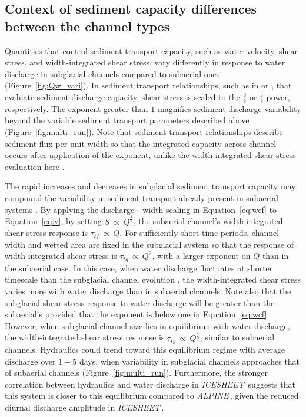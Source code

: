 \documentclass[11pt]{article}
\newcommand{\alpine}{\textit{ALPINE}\,}
\newcommand{\icesheet}{\textit{ICESHEET}\,}
\begin{document}
\subsection{Context of sediment capacity differences between the channel types}
Quantities that control sediment transport capacity, such as water velocity, shear stress, and width-integrated shear stress, vary differently in response to water discharge in subglacial channels compared to subaerial ones (Figure~\ref{fig:Qw_vari}).
In sediment transport relationships, such as in \citet{meyer1948} or \citet{engelund1967}, that evaluate sediment discharge capacity, shear stress is scaled to the $\frac{3}{2}$ or $\frac{5}{2}$ power, respectively.
The exponent greater than $1$ magnifies sediment discharge variability beyond the variable sediment transport parameters described above (Figure~\ref{fig:multi_run}).
Note that sediment transport relationships describe sediment flux per unit width so that the integrated capacity across channel occurs after application of the exponent, unlike the width-integrated shear stress evaluation here \citep[Equations\,\ref{eq:tautg} and \ref{eq:tautf}; c.f.][]{tucker1997}.

The rapid increases and decreases in subglacial sediment transport capacity may compound the variability in sediment transport already present in subaerial systems \citep[Figure~\ref{fig:Qw_vari}; ][]{williams1989,jerolmack2010}.
By applying the discharge - width scaling in Equation~\ref{eq:wcf} to Equation~\ref{eq:v}, by setting $S\, \propto \,Q^{\frac{1}{2}}$, the subaerial channel's width-integrated shear stress response is $\tau_{tf}\, \propto\,  Q$. 
For sufficiently short time periods,  channel width and wetted area are fixed in the subglacial system so that the response of width-integrated shear stress is $ \tau_{tg}\, \propto\,  Q^{2}$, with a larger exponent on $Q$ than in the subaerial case.
In this case, when water discharge fluctuates at shorter timescale than the subglacial channel evolution \citep{gimbert2016}, the width-integrated shear stress varies more with water discharge than in subaerial channels.
Note also that the subglacial shear-stress response to water discharge will be greater than the subaerial's provided that the exponent is below one in Equation~\ref{eq:wcf}.
However, when subglacial channel size lies in equilibrium with water discharge, the  width-integrated shear stress response is $\tau_{tg}\, \propto \, Q^{\frac{4}{5}}$, similar to subaerial channels.
Hydraulics could trend toward this equilibrium regime with average discharge over $1-5$ days, when variability in subglacial channels  approaches that of subaerial channels (Figure~\ref{fig:multi_run}).
Furthermore, the stronger correlation between hydraulics and water discharge in \icesheet{} suggests that this system is closer to this equilibrium compared to \alpine{}, given the reduced diurnal discharge amplitude in \icesheet{}.
\end{document}
